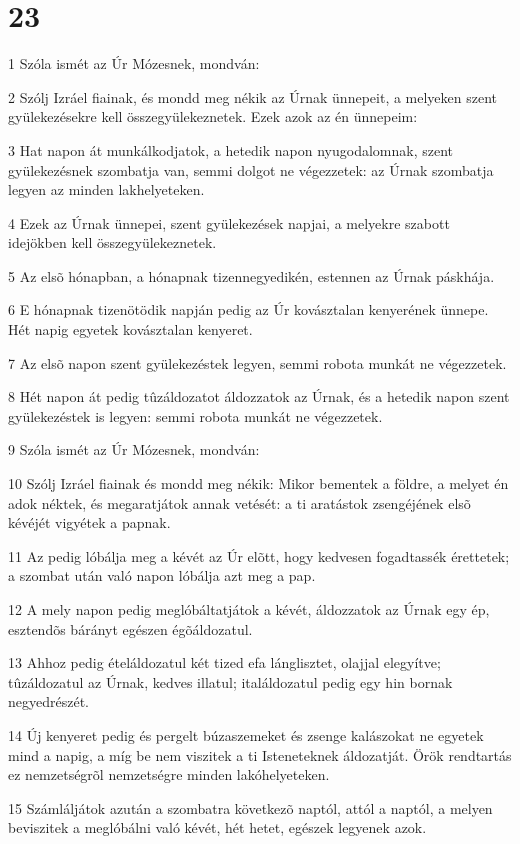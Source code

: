 \chapter{23}

\par 1 Szóla ismét az Úr Mózesnek, mondván:
\par 2 Szólj Izráel fiainak, és mondd meg nékik az Úrnak ünnepeit, a melyeken szent gyülekezésekre kell összegyülekeznetek. Ezek azok az én ünnepeim:
\par 3 Hat napon át munkálkodjatok, a hetedik napon nyugodalomnak, szent gyülekezésnek szombatja van, semmi dolgot ne végezzetek: az Úrnak szombatja legyen az minden lakhelyeteken.
\par 4 Ezek az Úrnak ünnepei, szent gyülekezések napjai, a melyekre szabott idejökben kell összegyülekeznetek.
\par 5 Az elsõ hónapban, a hónapnak tizennegyedikén, estennen az Úrnak páskhája.
\par 6 E hónapnak tizenötödik napján pedig az Úr kovásztalan kenyerének ünnepe. Hét napig egyetek kovásztalan kenyeret.
\par 7 Az elsõ napon szent gyülekezéstek legyen, semmi robota munkát ne végezzetek.
\par 8 Hét napon át pedig tûzáldozatot áldozzatok az Úrnak, és a hetedik napon szent gyülekezéstek is legyen: semmi robota munkát ne végezzetek.
\par 9 Szóla ismét az Úr Mózesnek, mondván:
\par 10 Szólj Izráel fiainak és mondd meg nékik: Mikor bementek a földre, a melyet én adok néktek, és megaratjátok annak vetését: a ti aratástok zsengéjének elsõ kévéjét vigyétek a papnak.
\par 11 Az pedig lóbálja meg a kévét az Úr elõtt, hogy kedvesen fogadtassék érettetek; a szombat után való napon lóbálja azt meg a pap.
\par 12 A mely napon pedig meglóbáltatjátok a kévét, áldozzatok az Úrnak egy ép, esztendõs bárányt egészen égõáldozatul.
\par 13 Ahhoz pedig ételáldozatul két tized efa lánglisztet, olajjal elegyítve; tûzáldozatul az Úrnak, kedves illatul; italáldozatul pedig egy hin bornak negyedrészét.
\par 14 Új kenyeret pedig és pergelt búzaszemeket és zsenge kalászokat ne egyetek mind a napig, a míg be nem viszitek a ti Isteneteknek áldozatját. Örök rendtartás ez nemzetségrõl nemzetségre minden lakóhelyeteken.
\par 15 Számláljátok azután a szombatra következõ naptól, attól a naptól, a melyen beviszitek a meglóbálni való kévét, hét hetet, egészek legyenek azok.
